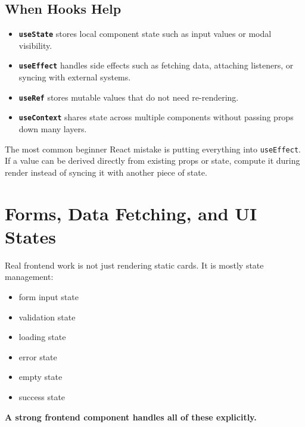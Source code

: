 \documentclass[12pt, a4paper, oneside]{book}
\begin{document}
\subsection{When Hooks Help}
\begin{itemize}[leftmargin=2em]
    \item \textbf{\texttt{useState}} stores local component state such as input values or modal visibility.
    \item \textbf{\texttt{useEffect}} handles side effects such as fetching data, attaching listeners, or syncing with external systems.
    \item \textbf{\texttt{useRef}} stores mutable values that do not need re-rendering.
    \item \textbf{\texttt{useContext}} shares state across multiple components without passing props down many layers.
\end{itemize}

\begin{warningbox}
The most common beginner React mistake is putting everything into \texttt{useEffect}. If a value can be derived directly from existing props or state, compute it during render instead of syncing it with another piece of state.
\end{warningbox}

\section{Forms, Data Fetching, and UI States}

Real frontend work is not just rendering static cards. It is mostly state management:
\begin{itemize}[leftmargin=2em]
    \item form input state
    \item validation state
    \item loading state
    \item error state
    \item empty state
    \item success state
\end{itemize}

\textbf{A strong frontend component handles all of these explicitly.}
\end{document}
